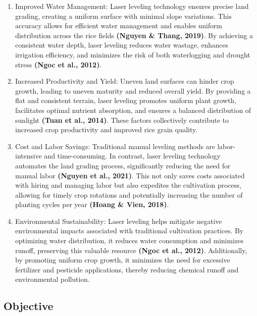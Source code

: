 \documentclass[
]{article}
\begin{document}
\begin{enumerate}
\def\labelenumi{\arabic{enumi}.}
\item
  Improved Water Management: Laser leveling technology ensures precise
  land grading, creating a uniform surface with minimal slope
  variations. This accuracy allows for efficient water management and
  enables uniform distribution across the rice fields \textbf{(Nguyen \&
  Thang, 2019)}. By achieving a consistent water depth, laser leveling
  reduces water wastage, enhances irrigation efficiency, and minimizes
  the risk of both waterlogging and drought stress \textbf{(Ngoc et al.,
  2012)}.
\item
  Increased Productivity and Yield: Uneven land surfaces can hinder crop
  growth, leading to uneven maturity and reduced overall yield. By
  providing a flat and consistent terrain, laser leveling promotes
  uniform plant growth, facilitates optimal nutrient absorption, and
  ensures a balanced distribution of sunlight \textbf{(Tuan et al.,
  2014)}. These factors collectively contribute to increased crop
  productivity and improved rice grain quality.
\item
  Cost and Labor Savings: Traditional manual leveling methods are
  labor-intensive and time-consuming. In contrast, laser leveling
  technology automates the land grading process, significantly reducing
  the need for manual labor \textbf{(Nguyen et al., 2021)}. This not
  only saves costs associated with hiring and managing labor but also
  expedites the cultivation process, allowing for timely crop rotations
  and potentially increasing the number of planting cycles per year
  \textbf{(Hoang \& Vien, 2018)}.
\item
  Environmental Sustainability: Laser leveling helps mitigate negative
  environmental impacts associated with traditional cultivation
  practices. By optimizing water distribution, it reduces water
  consumption and minimizes runoff, preserving this valuable resource
  \textbf{(Ngoc et al., 2012)}. Additionally, by promoting uniform crop
  growth, it minimizes the need for excessive fertilizer and pesticide
  applications, thereby reducing chemical runoff and environmental
  pollution.
\end{enumerate}

\hypertarget{objective}{%
\subsection{Objective}\label{objective}}
\end{document}
